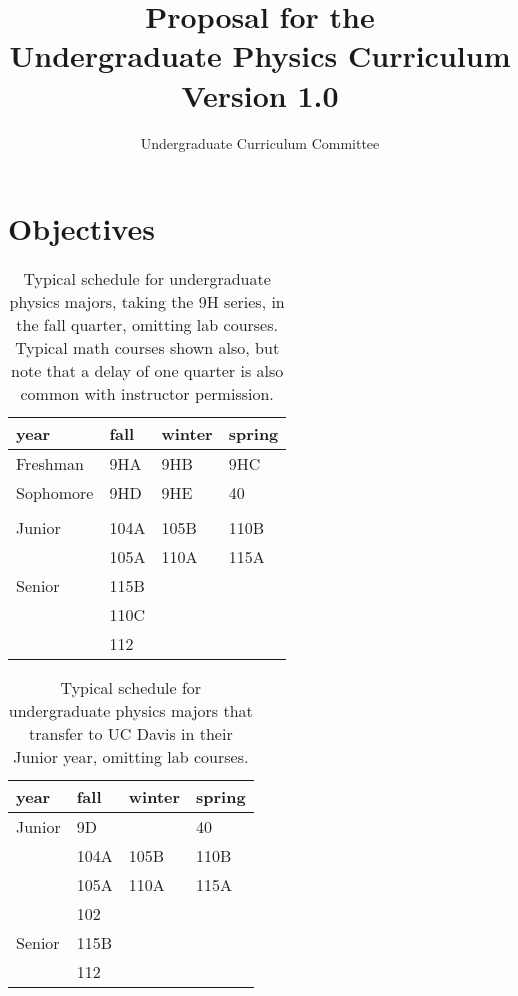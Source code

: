 \documentclass[12pt]{article}
\begin{document}

\title{Proposal for the \\ Undergraduate Physics Curriculum \\ Version 1.0}
\author{Undergraduate Curriculum Committee}

\maketitle

\section{Objectives}

\begin{table}
\caption{Typical schedule for undergraduate physics majors, taking the 9H series, in the fall quarter, omitting lab courses.  Typical math courses shown also, but note that a delay of one quarter is also common with instructor permission.}
\label{tbl:current-honors}
\begin{center}
\begin{tabular}{|l|l|l|l|}
\hline
year      & fall    & winter & spring  \\
\hline
Freshman  & 9HA  & 9HB  & 9HC \\
\hline
Sophomore & 9HD  & 9HE   & 40     \\
          &      &        &        \\
\hline
Junior    & 104A & 105B & 110B\\
          & 105A & 110A & 115A\\
\hline
Senior    & 115B &        & \\
          & 110C &        & \\
          & 112  &        & \\

\hline 
\end{tabular}
\end{center}
\end{table}

\begin{table}
\caption{Typical schedule for undergraduate physics majors that transfer to UC Davis in their Junior year, omitting lab courses.}
\label{tbl:current-transfers}
\begin{center}
\begin{tabular}{|l|l|l|l|}
\hline
year      & fall    & winter & spring  \\
\hline
Junior    & 9D  &    & 40     \\
          & 104A & 105B & 110B\\
          & 105A & 110A & 115A\\
          & 102 &       & \\
\hline
Senior    & 115B &        & \\
          & 112  &        & \\
\hline 
\end{tabular}
\end{center}
\end{table}
\end{document}
